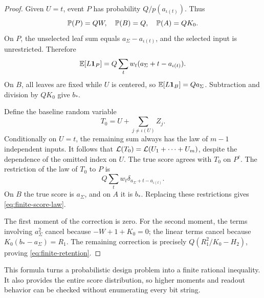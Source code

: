 \begin{proof}
Given \(U=t\), event \(P\) has probability
\(Q/p(a_{\iota(t)})\). Thus
\[
 \mathbb P(P)=QW,\quad \mathbb P(B)=Q,\quad \mathbb P(A)=QK_0.
\]
On \(P\), the unselected leaf sum equals
\(a_\Sigma-a_{\iota(t)}\), and the selected input is unrestricted.
Therefore
\[
 \mathbb E[L\mathbf 1_P]=Q\sum_t w_t(a_\Sigma+t-a_{\iota(t)}).
\]
On \(B\), all leaves are fixed while \(U\) is centered, so
\(\mathbb E[L\mathbf 1_B]=Qa_\Sigma\). Subtraction and division by \(QK_0\)
give \(b_*\).

Define the baseline random variable
\[
 T_0=U+\sum_{j\ne\iota(U)} Z_j.
\]
Conditionally on \(U=t\), the remaining sum always has the law of
\(m-1\) independent inputs. It follows that
\(\mathcal L(T_0)=\mathcal L(U_1+\cdots+U_m)\), despite the
dependence of the omitted index on \(U\).
The true score agrees with \(T_0\) on \(P^c\).
The restriction of the law of \(T_0\) to \(P\) is
\[
 Q\sum_t w_t\delta_{a_\Sigma+t-a_{\iota(t)}}.
\]
On \(B\) the true score is \(a_\Sigma\), and on \(A\) it is \(b_*\).
Replacing these restrictions gives \eqref{eq:finite-score-law}.

The first moment of the correction is zero. For the second moment,
the terms involving \(a_\Sigma^2\) cancel because
\(-W+1+K_0=0\); the linear terms cancel because
\(K_0(b_*-a_\Sigma)=R_1\). The remaining correction is precisely
\(Q(R_1^2/K_0-H_2)\), proving \eqref{eq:finite-retention}.
\end{proof}

This formula turns a probabilistic design problem into a finite
rational inequality. It also provides the entire score distribution,
so higher moments and readout behavior can be checked without
enumerating every bit string.
